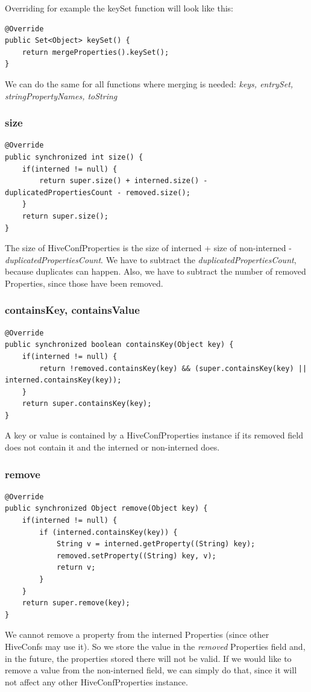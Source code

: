 \noindent Overriding for example the keySet function will look like this:
\begin{lstlisting}
@Override
public Set<Object> keySet() {
	return mergeProperties().keySet();
}
\end{lstlisting}

We can do the same for all functions where merging is needed: \textit{keys, entrySet, stringPropertyNames, toString \etc}

\subsubsection{size}
\begin{lstlisting}
@Override
public synchronized int size() {
	if(interned != null) {
		return super.size() + interned.size() - duplicatedPropertiesCount - removed.size();
	}
	return super.size();
}
\end{lstlisting}
The size of HiveConfProperties is the size of interned + size of non-interned - \textit{duplicatedPropertiesCount}. We have to subtract the \textit{duplicatedPropertiesCount}, because duplicates can happen. Also, we have to subtract the number of removed Properties, since those have been removed.

\subsubsection{containsKey, containsValue}
\begin{lstlisting}
@Override
public synchronized boolean containsKey(Object key) {
	if(interned != null) {
		return !removed.containsKey(key) && (super.containsKey(key) || interned.containsKey(key));
	}
	return super.containsKey(key);
}
\end{lstlisting}
A key or value is contained by a HiveConfProperties instance if its removed field does not contain it and the interned or non-interned does.

\subsubsection{remove}
\begin{lstlisting}
@Override
public synchronized Object remove(Object key) {
	if(interned != null) {
		if (interned.containsKey(key)) {	
			String v = interned.getProperty((String) key);
			removed.setProperty((String) key, v);
			return v;
		}
	}
	return super.remove(key);
}
\end{lstlisting}
We cannot remove a property from the interned Properties (since other HiveConfs may use it). So we store the value in the \textit{removed} Properties field and, in the future, the properties stored there will not be valid. If we would like to remove a value from the non-interned field, we can simply do that, since it will not affect any other HiveConfProperties instance.

